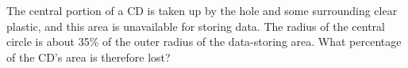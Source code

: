 The central portion of a CD is taken up by the hole
and some surrounding clear plastic, and this area is
unavailable for storing data. The radius of the central
circle is about 35\% of the outer radius of the data-storing area.
What percentage of the CD's area is therefore lost? \answercheck
